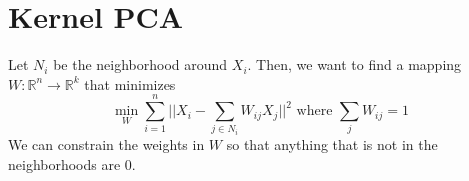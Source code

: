 \section{Kernel PCA}

  \begin{definition}
    Let $N_i$ be the neighborhood around $X_i$. Then, we want to find a mapping $W: \mathbb{R}^n \rightarrow \mathbb{R}^k$ that minimizes 
    \begin{equation}
      \min_{W} \sum_{i=1}^n \bigg| \bigg| X_i - \sum_{j \in N_i} W_{ij} X_j \bigg| \bigg|^2 \text{ where } \sum_{j} W_{ij} = 1
    \end{equation}
    We can constrain the weights in $W$ so that anything that is not in the neighborhoods are $0$. 
  \end{definition}

